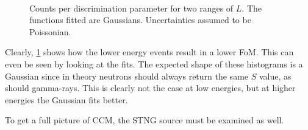 \documentclass[11pt]{article}
\numberwithin{equation}{section}
\numberwithin{figure}{section}
\numberwithin{table}{section}
\begin{document}
\begin{figure}[h]%
    \centering
    \,
    \caption{Counts per discrimination parameter for two ranges of $L$. The functions fitted are Gaussians. Uncertainties assumed to be Poissonian.}
    \label{fig:CCM_AmBe_separation_hist_split}
\end{figure}
\par Clearly, \cref{fig:CCM_AmBe_separation_hist_split} shows how the lower energy events result in a lower FoM. This can even be seen by looking at the fits. The expected shape of these histograms is a Gaussian since in theory neutrons should always return the same $S$ value, as should gamma-rays. This is clearly not the case at low energies, but at higher energies the Gaussian fits better. 
\par To get a full picture of CCM, the STNG source must be examined as well. 
\end{document}
